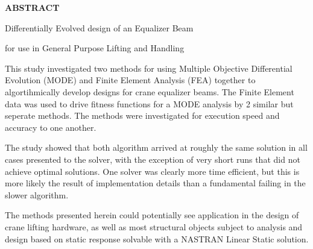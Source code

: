 {\LARGE\center
  \textbf{\uppercase{Abstract}}\par
}

{\Large{ {\centerline{Differentially Evolved design of an Equalizer Beam}}}}
{\Large{ {\centerline{for use in General Purpose Lifting and Handling}}}}

\vspace{1cm}

This study investigated two methods for using Multiple Objective Differential Evolution (MODE) and Finite Element Analysis (FEA) together to algortihmically develop designs for crane equalizer beams. The Finite Element data was used to drive fitness functions for a MODE analysis by 2 similar but seperate methods. The methods were investigated for execution speed and accuracy to one another. 

The study showed that both algorithm arrived at roughly the same solution in all cases presented to the solver, with the exception of very short runs that did not achieve optimal solutions. One solver was clearly more time efficient, but this is more likely the result of implementation details than a fundamental failing in the slower algorithm. 

The methods presented herein could potentially see application in the design of crane lifting hardware, as well as most structural objects subject to analysis and design based on static response solvable with a NASTRAN Linear Static solution. 
